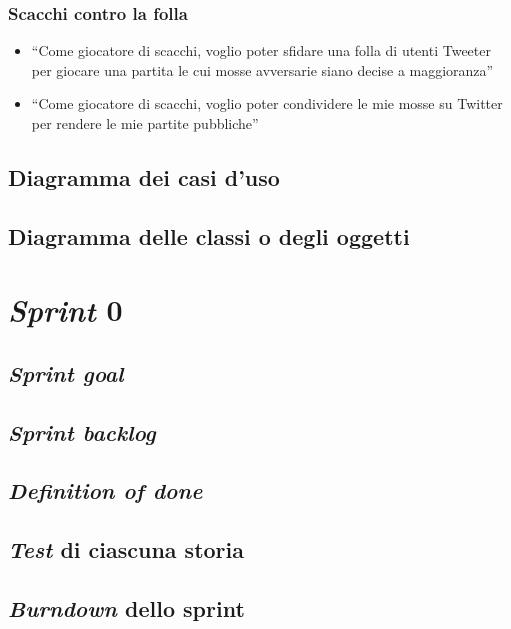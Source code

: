 \documentclass{article}
\begin{document}
\subsubsection{Scacchi contro la folla}

\begin{itemize}
	\item ``Come giocatore di scacchi, voglio poter sfidare una folla di utenti
	      Tweeter per giocare una partita le cui mosse avversarie siano decise a
	      maggioranza''
	\item ``Come giocatore di scacchi, voglio poter condividere le mie mosse su
	      Twitter per rendere le mie partite pubbliche''
\end{itemize}

\subsection{Diagramma dei casi d'uso}



\subsection{Diagramma delle classi o degli oggetti}

\section{\emph{Sprint} 0}

\subsection{\emph{Sprint goal}}

\subsection{\emph{Sprint backlog}}

\subsection{\emph{Definition of done}}

\subsection{\emph{Test} di ciascuna storia}

\subsection{\emph{Burndown} dello sprint}
\end{document}
